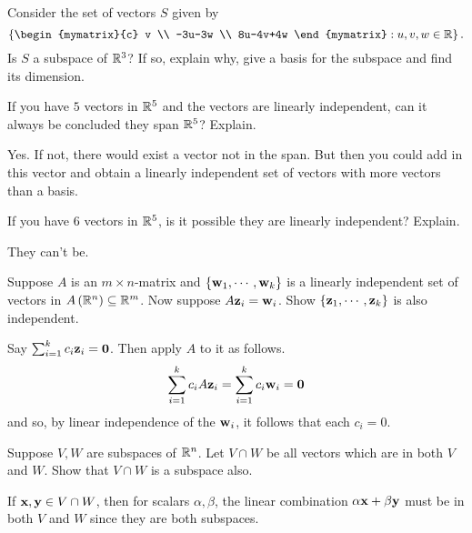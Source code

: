 \begin{enumialphparenastyle}
\begin{ex} Consider the set of vectors $S$ given by  
\begin{equation*}
\set{\begin{mymatrix}{c}
v \\ 
-3u-3w \\ 
8u-4v+4w
\end{mymatrix} :u,v,w\in \R} .
\end{equation*}
Is $S$ a subspace of $\mathbb{R}^{3}$? If so, explain why,
give a basis for the subspace and find its dimension.
\end{ex}

\begin{ex} If you have $5$ vectors in $\mathbb{R}^{5}$ and the vectors are
linearly independent, can it always be concluded they span $\mathbb{R}^{5}$?
Explain. 
\begin{sol}
 Yes. If not, there would exist a vector not in the span. But then
you could add in this vector and obtain a linearly independent set of
vectors with more vectors than a basis.
\end{sol}
\end{ex}

\begin{ex} If you have $6$ vectors in $\mathbb{R}^{5}$, is it possible they are
linearly independent? Explain.
\begin{sol}
They can't be.
\end{sol}
\end{ex}


\begin{ex} Suppose $A$ is an $m\times n$-matrix and $\left\{\mbox{\bf w}
_{1},\cdots ,\mbox{\bf w}_{k}\right\} $ is a linearly independent set of
vectors in $A\left(\mathbb{R}^{n}\right) \subseteq \mathbb{R}^{m}$. Now
suppose $A\mbox{\bf z}_{i}=\mbox{\bf w}_{i}$. Show $\left\{
\mbox{\bf z}_{1},\cdots ,\mbox{\bf z}_{k}\right\} $ is also independent. 
\begin{sol}
 Say $
\sum_{i=1}^{k}c_{i}\mbox{\bf z}_{i}=\mbox{\bf 0}$. Then apply $A$ to it as follows.
\[
\sum_{i=1}^{k}c_{i}A\mbox{\bf z}_{i}=\sum_{i=1}^{k}c_{i}\mbox{\bf w}_{i}=\mbox{\bf 0}
\]
and so, by linear independence of the $\mbox{\bf w}_{i}$, it follows that each
$c_{i}=0$.
\end{sol}
\end{ex}

\begin{ex} Suppose $V, W$ are subspaces of $\mathbb{R}^{n}$. Let $V\cap W$
be all vectors which are in both $V$ and $W$. Show that $V \cap W$ is a subspace also. 
\begin{sol}
If $\mbox{\bf x}, \mbox{\bf y}\in V\cap W$, then for scalars $\alpha
,\beta$, the linear combination $\alpha \mbox{\bf x}+\beta \mbox{\bf y}$ must
be in both $V$ and $W$ since they are both subspaces.
\end{sol}
\end{ex}


\end{enumialphparenastyle}
